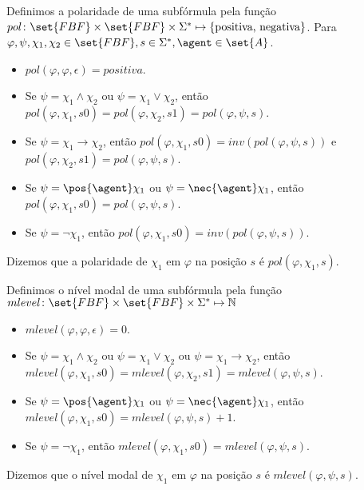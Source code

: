 \begin{definition}
Definimos a polaridade de uma subfórmula pela função $pol \colon \set{FBF} \times \set{FBF} \times \Sigma^* \mapsto \{\text{positiva, negativa}\}$.  Para $\varphi, \psi, \chi_1, \chi_2 \in \set{FBF}, s \in \Sigma^*, \agent \in \set{A}$.

\begin{itemize}
\item[] $pol(\varphi, \varphi, \epsilon) = positiva$.
  \item Se $\psi = \chi_1 \land \chi_2$ ou $\psi = \chi_1 \lor \chi_2$, então $pol(\varphi, \chi_1, s0) = pol(\varphi, \chi_2, s1) = pol(\varphi, \psi, s)$.
  \item Se $\psi = \chi_1 \rightarrow \chi_2$, então $pol(\varphi, \chi_1, s0) = inv(pol(\varphi, \psi, s))$ e $pol(\varphi, \chi_2, s1) = pol(\varphi, \psi, s)$.
  \item Se $\psi = \pos{\agent}\chi_1$ ou $\psi = \nec{\agent}\chi_1$, então $pol(\varphi, \chi_1, s0) = pol(\varphi, \psi, s)$.
  \item Se $\psi = \neg\chi_1$, então $pol(\varphi, \chi_1, s0) = inv(pol(\varphi, \psi, s))$.
\end{itemize}

\end{definition}
  Dizemos que a polaridade de $\chi_1$ em $\varphi$ na posição $s$ é $pol(\varphi, \chi_1, s)$.

\begin{definition}
Definimos o nível modal de uma subfórmula pela função $mlevel \colon \set{FBF} \times \set{FBF} \times \Sigma^* \mapsto \mathbb{N}$

\begin{itemize}
  \item $mlevel(\varphi, \varphi, \epsilon) = 0$.
  \item Se $\psi = \chi_1 \land \chi_2$ ou $\psi = \chi_1 \lor \chi_2$ ou $\psi = \chi_1 \rightarrow \chi_2$, então $mlevel(\varphi, \chi_1, s0) = mlevel(\varphi, \chi_2, s1) = mlevel(\varphi, \psi, s)$.
  \item Se $\psi = \pos{\agent}\chi_1$ ou $\psi = \nec{\agent}\chi_1$, então $mlevel(\varphi, \chi_1, s0) = mlevel(\varphi, \psi, s)+1$.
  \item Se $\psi = \neg\chi_1$, então $mlevel(\varphi, \chi_1, s0) = mlevel(\varphi, \psi, s)$.
\end{itemize}
\end{definition}
Dizemos que o nível modal de $\chi_1$ em $\varphi$ na posição $s$ é $mlevel(\varphi, \psi, s)$.


